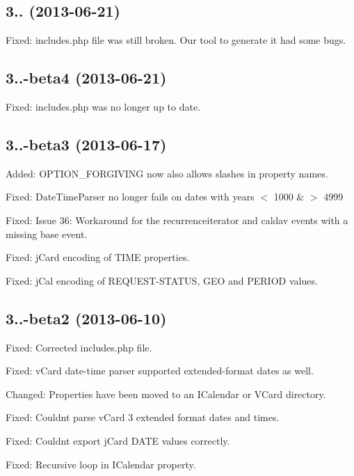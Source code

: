\subsection*{3.. (2013-\/06-\/21) }


\begin{DoxyItemize}
\item Fixed\+: includes.\+php file was still broken. Our tool to generate it had some bugs.
\end{DoxyItemize}

\subsection*{3..-\/beta4 (2013-\/06-\/21) }


\begin{DoxyItemize}
\item Fixed\+: includes.\+php was no longer up to date.
\end{DoxyItemize}

\subsection*{3..-\/beta3 (2013-\/06-\/17) }


\begin{DoxyItemize}
\item Added\+: O\+P\+T\+I\+O\+N\+\_\+\+F\+O\+R\+G\+I\+V\+I\+NG now also allows slashes in property names.
\item Fixed\+: Date\+Time\+Parser no longer fails on dates with years $<$ 1000 \& $>$ 4999
\item Fixed\+: Issue 36\+: Workaround for the recurrenceiterator and caldav events with a missing base event.
\item Fixed\+: j\+Card encoding of T\+I\+ME properties.
\item Fixed\+: j\+Cal encoding of R\+E\+Q\+U\+E\+S\+T-\/\+S\+T\+A\+T\+US, G\+EO and P\+E\+R\+I\+OD values.
\end{DoxyItemize}

\subsection*{3..-\/beta2 (2013-\/06-\/10) }


\begin{DoxyItemize}
\item Fixed\+: Corrected includes.\+php file.
\item Fixed\+: v\+Card date-\/time parser supported extended-\/format dates as well.
\item Changed\+: Properties have been moved to an I\+Calendar or V\+Card directory.
\item Fixed\+: Couldn\textquotesingle{}t parse v\+Card 3 extended format dates and times.
\item Fixed\+: Couldn\textquotesingle{}t export j\+Card D\+A\+TE values correctly.
\item Fixed\+: Recursive loop in I\+Calendar property.
\end{DoxyItemize}

